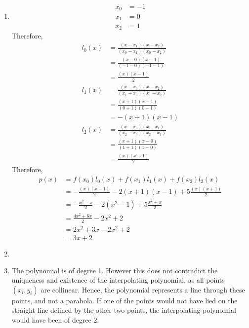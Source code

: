 \documentclass[fleqn, a4paper, 11pt, oneside]{amsart}
\theoremstyle{definition}
\theoremstyle{theorem}
\begin{document}
\begin{solution}
	\begin{enumerate}[leftmargin=*]
		\item
			\begin{align*}
				x_0 &= -1\\
				x_1 &= 0\\
				x_2 &= 1
			\end{align*}
			Therefore,
			\begin{align*}
				l_0(x) &= \frac{(x - x_1) (x - x_2)}{(x_0 - x_1) (x_0 - x_2)}\\
				&= \frac{(x - 0) (x - 1)}{(-1 - 0) (-1 - 1)}\\
				&= \frac{(x) (x - 1)}{2}\\
				l_1(x) &= \frac{(x - x_0) (x - x_2)}{(x_1 - x_0) (x_1 - x_2)}\\
				&= \frac{(x + 1) (x - 1)}{(0 + 1) (0 - 1)}\\
				&= -(x + 1) (x - 1)\\
				l_2(x) &= \frac{(x - x_0) (x - x_1)}{(x_2 - x_0) (x_2 - x_1)}\\
				&= \frac{(x + 1) (x - 0)}{(1 + 1) (1 - 0)}\\
				&= \frac{(x) (x + 1)}{2}
			\end{align*}
			Therefore,
			\begin{align*}
				p(x) &= f(x_0) l_0(x) + f(x_1) l_1(x) + f(x_2) l_2(x)\\
				&= -\frac{(x) (x - 1)}{2} - 2 (x + 1) (x - 1) + 5 \frac{(x) (x + 1)}{2}\\
				&= -\frac{x^2 - x}{2} - 2 (x^2 - 1) + 5 \frac{x^2 + x}{2}\\
				&= \frac{4 x^2 + 6 x}{2} - 2 x^2 + 2\\
				&= 2 x^2 + 3 x - 2 x^2 + 2\\
				&= 3 x + 2
			\end{align*}
		\item

		\item
			The polynomial is of degree 1.
			However this does not contradict the uniqueness and existence of the interpolating polynomial, as all points $(x_i,y_i)$ are collinear.
			Hence, the polynomial represents a line through these points, and not a parabola.
			If one of the points would not have lied on the straight line defined by the other two points, the interpolating polynomial would have been of degree 2.
	\end{enumerate}
\end{solution}
\end{document}
